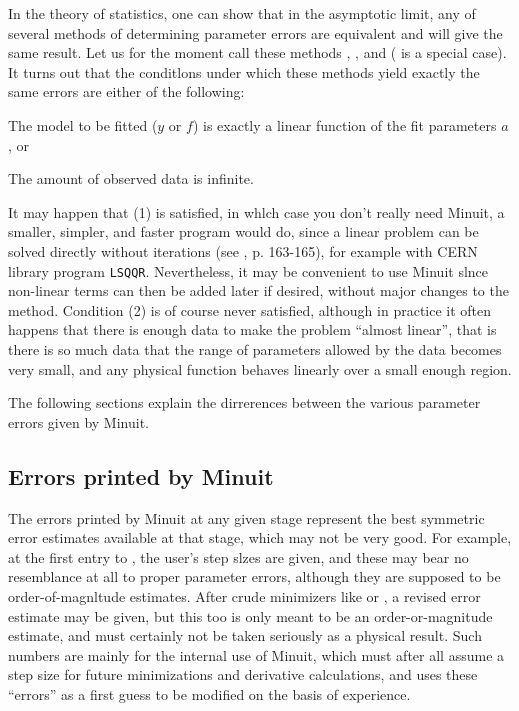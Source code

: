 In the theory of statistics, one can show that in the asymptotic
limit, any of several methods of determining parameter errors are
equivalent and will give the same result.  Let us for the moment call
these methods , , and
 ( is a special case).  It
turns out that the conditlons under which these methods yield exactly
the same errors are either of the following:
 
\begin{OL}
\item The model to be fitted ($y$ or $f$) is exactly a linear function of the 
      fit parameters $a$, or
\item The amount of observed data is infinite.
\end{OL}
 
It may happen that (1) is  satisfied, in whlch case you don't really 
need Minuit, a smaller, simpler, and faster program would do, since 
a linear problem can be solved directly without iterations (see \cite{bib-EADIE},
p. 163-165), for example with CERN library program \texttt{LSQQR}. 
Nevertheless, it may be convenient to use Minuit slnce non-linear 
terms can then be added later if desired, without major changes to 
the method. Condition (2) is of course never satisfied, although in 
practice it often happens that there is enough data to make the 
problem ``almost linear'', that is there is so much data that the 
range of parameters allowed by the data becomes very small, and 
any physical function behaves linearly over a small enough region.
 
The following sections explain the dirrerences between the various 
parameter errors given by Minuit.
 
\subsection{Errors printed by Minuit}
 
The errors printed by Minuit at any given stage represent the best 
symmetric error estimates available at that stage, which may not 
be very good. For example, at the first entry to , the user's step 
slzes are given, and these may bear no resemblance at all to proper 
parameter errors, although they are supposed to be order-of-magnltude estimates. 
After crude minimizers like  or , 
a revised error estimate may be given, but this too is only meant to
be an order-or-magnitude estimate, and must certainly not be 
taken seriously as a physical result. Such numbers are mainly for 
the internal use of Minuit, which must after all assume a step size 
for future minimizations and derivative calculations, and uses these 
``errors'' as a first guess to be modified on the basis of experience.
 
